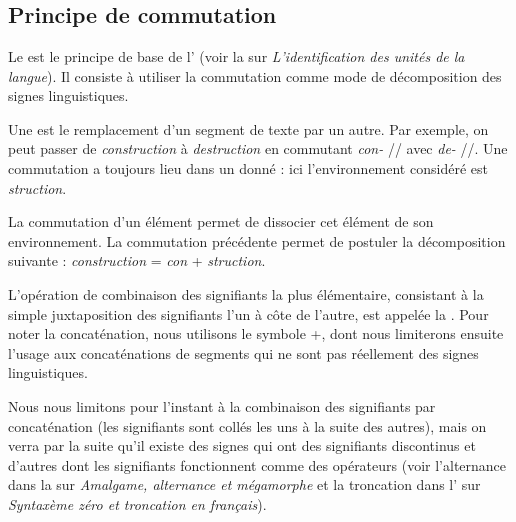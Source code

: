 \chapter{}\label{sec:2.2}

\section{Principe de commutation}\label{sec:2.2.0}

Le  est le principe de base de l’ (voir la  sur \textit{L’identification des unités de la langue}). Il consiste à utiliser la commutation comme mode de décomposition des signes linguistiques.

{Une  est le remplacement d’un segment de texte par un autre. Par exemple, on peut passer de \textit{construction} à \textit{destruction} en commutant \textit{con-} // avec \textit{de-} //. Une commutation a toujours lieu dans un  donné : ici l’environnement considéré est {\longrule}\textit{struction}.}

La commutation d’un élément permet de dissocier cet élément de son environnement. La commutation précédente permet de postuler la décomposition suivante : \textit{construction} = \textit{con} + \textit{struction}.

{L’opération de combinaison des signifiants la plus élémentaire, consistant à la simple juxtaposition des signifiants l'un à côte de l'autre, est appelée la . Pour noter la concaténation, nous utilisons le symbole +, dont nous limiterons ensuite l'usage aux concaténations de segments qui ne sont pas réellement des signes linguistiques.}

Nous nous limitons pour l’instant à la combinaison des signifiants par concaténation (les signifiants sont collés les uns à la suite des autres), mais on verra par la suite qu’il existe des signes qui ont des signifiants discontinus et d’autres dont les signifiants fonctionnent comme des opérateurs (voir l’alternance dans la  sur \textit{Amalgame, alternance et mégamorphe} et la troncation dans l’ sur \textit{Syntaxème zéro et troncation en français}).


